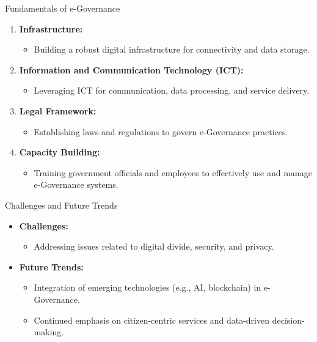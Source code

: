 \begin{frame}{Fundamentals of e-Governance}
  \begin{enumerate}
    \item \textbf{Infrastructure:}
      \begin{itemize}
        \item Building a robust digital infrastructure for connectivity and data storage.
      \end{itemize}
    \item \textbf{Information and Communication Technology (ICT):}
      \begin{itemize}
        \item Leveraging ICT for communication, data processing, and service delivery.
      \end{itemize}
    \item \textbf{Legal Framework:}
      \begin{itemize}
        \item Establishing laws and regulations to govern e-Governance practices.
      \end{itemize}
    \item \textbf{Capacity Building:}
      \begin{itemize}
        \item Training government officials and employees to effectively use and manage e-Governance systems.
      \end{itemize}
  \end{enumerate}
\end{frame}

\begin{frame}{Challenges and Future Trends}
  \begin{itemize}
    \item \textbf{Challenges:}
      \begin{itemize}
        \item Addressing issues related to digital divide, security, and privacy.
      \end{itemize}
    \item \textbf{Future Trends:}
      \begin{itemize}
        \item Integration of emerging technologies (e.g., AI, blockchain) in e-Governance.
        \item Continued emphasis on citizen-centric services and data-driven decision-making.
      \end{itemize}
  \end{itemize}
\end{frame}

